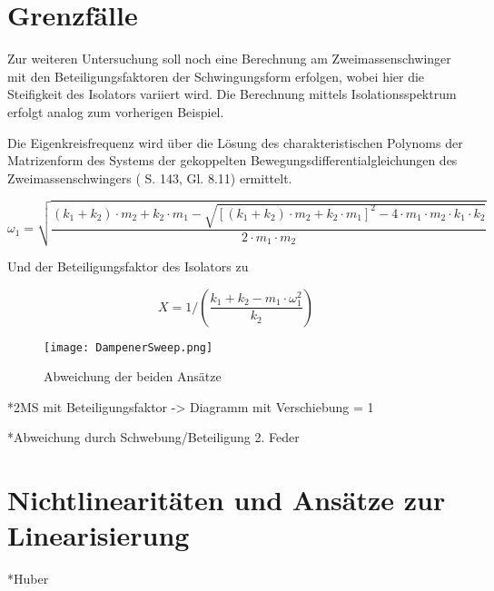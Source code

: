 \pagebreak

\section{Grenzfälle}
\label{sec:grenzfalle}

Zur weiteren Untersuchung soll noch eine Berechnung am Zweimassenschwinger mit den Beteiligungsfaktoren der Schwingungsform erfolgen, wobei hier die Steifigkeit des Isolators variiert wird. Die Berechnung mittels Isolationsspektrum erfolgt analog zum vorherigen Beispiel.

Die Eigenkreisfrequenz wird über die Lösung des charakteristischen Polynoms der Matrizenform des Systems der gekoppelten Bewegungsdifferentialgleichungen des Zweimassenschwingers (\cite{Pocanschi} S. 143, Gl. 8.11) ermittelt.

\begin{equation*}
\omega_1 = \sqrt{\frac{(k_1 + k_2) \cdot m_2 + k_2 \cdot m_1 - \sqrt{[(k_1 + k_2) \cdot m_2 + k_2 \cdot  m_1]^2 - 4 \cdot m_1 \cdot m_2 \cdot k_1 \cdot k_2}}{2 \cdot m_1 \cdot m_2}}
\end{equation*}

Und der Beteiligungsfaktor des Isolators zu

\begin{equation*}
X = 1/\left( \frac{k_1 + k_2 - m_1 \cdot \omega_1^2}{k_2} \right)
\end{equation*}

\begin{figure}[ht] 
    \centering
    \texttt{[image: DampenerSweep.png]}
    \caption{Abweichung der beiden Ansätze}
    \label{fig:Bemessungsspektrum}
\end{figure}

*2MS mit Beteiligungsfaktor  -> Diagramm mit Verschiebung = 1

*Abweichung durch Schwebung/Beteiligung 2. Feder 

\pagebreak

\section{Nichtlinearitäten und Ansätze zur Linearisierung}
\label{sec:nichtlinearitaten}

*Huber

\pagebreak